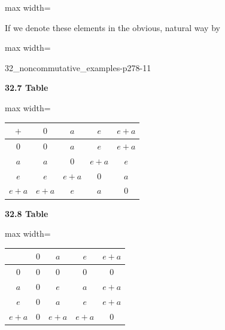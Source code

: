 \documentclass[11pt,oneside]{article}
\begin{document}
\begin{BookBody}
\begin{center}\begin{adjustbox}{max width=\linewidth}\end{adjustbox}\end{center}

\noindent If we denote these elements in the obvious, natural way by

\begin{center}\begin{adjustbox}{max width=\linewidth}\end{adjustbox}\end{center}

\begin{BookFloat}{32_noncommutative_examples-p278-11}
\begin{center}
\begin{minipage}[t]{.48\linewidth}\centering\textbf{32.7 Table}\par\smallskip
\begin{adjustbox}{max width=\linewidth}\renewcommand{\arraystretch}{1.2}
\begin{tabular}{c|cccc}
$+$&$0$&$a$&$e$&$e+a$\\\hline
$0$&$0$&$a$&$e$&$e+a$\\\hline
$a$&$a$&$0$&$e+a$&$e$\\\hline
$e$&$e$&$e+a$&$0$&$a$\\\hline
$e+a$&$e+a$&$e$&$a$&$0$
\end{tabular}\end{adjustbox}\end{minipage}\hfill
\begin{minipage}[t]{.48\linewidth}\centering\textbf{32.8 Table}\par\smallskip
\begin{adjustbox}{max width=\linewidth}\renewcommand{\arraystretch}{1.2}
\begin{tabular}{c|cccc}
&$0$&$a$&$e$&$e+a$\\\hline
$0$&$0$&$0$&$0$&$0$\\\hline
$a$&$0$&$e$&$a$&$e+a$\\\hline
$e$&$0$&$a$&$e$&$e+a$\\\hline
$e+a$&$0$&$e+a$&$e+a$&$0$
\end{tabular}\end{adjustbox}\end{minipage}
\end{center}
\end{BookFloat}


\end{BookBody}
\end{document}
